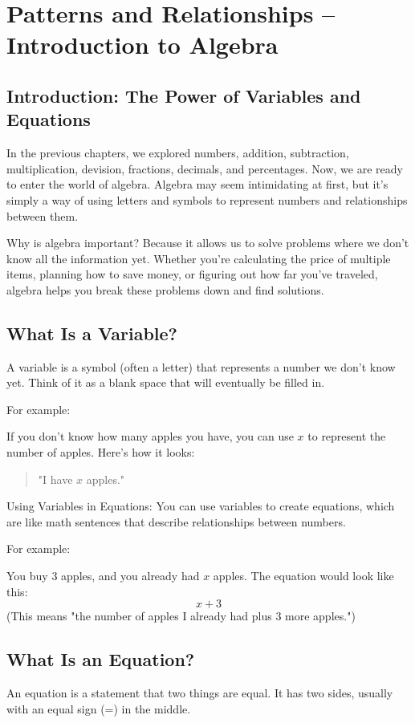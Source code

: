 \chapter{Patterns and Relationships – Introduction to Algebra}
\section{Introduction: The Power of Variables and Equations}
In the previous chapters, we explored numbers, addition, subtraction, multiplication, devision, fractions, decimals, and percentages. Now, we are ready to enter the world of algebra. Algebra may seem intimidating at first, but it's simply a way of using letters and symbols to represent numbers and relationships between them.

Why is algebra important? Because it allows us to solve problems where we don't know all the information yet. Whether you're calculating the price of multiple items, planning how to save money, or figuring out how far you've traveled, algebra helps you break these problems down and find solutions.

\section{What Is a Variable?}
A variable is a symbol (often a letter) that represents a number we don’t know yet. Think of it as a blank space that will eventually be filled in.

For example:

If you don’t know how many apples you have, you can use $x$ to represent the number of apples.
Here’s how it looks:

\begin{quote}
"I have $x$ apples."
\end{quote}

Using Variables in Equations: You can use variables to create equations, which are like math sentences that describe relationships between numbers.

For example:

You buy 3 apples, and you already had $x$ apples. The equation would look like this:
\[ x + 3 \]
(This means "the number of apples I already had plus 3 more apples.")

\section{What Is an Equation?}
An equation is a statement that two things are equal. It has two sides, usually with an equal sign (=) in the middle.

